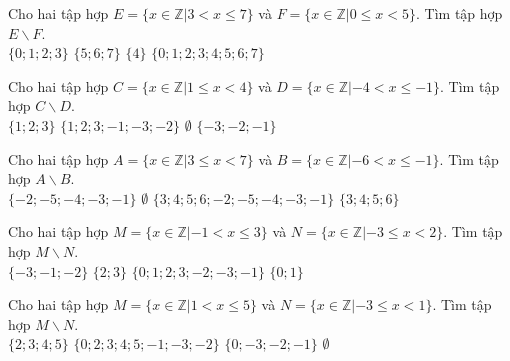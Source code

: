 \begin{ex}
 Cho hai tập hợp $E=\{x\in \mathbb{Z}|3 < x \le 7\}$ và $F=\{x\in \mathbb{Z}|0 \le x < 5\}$. Tìm tập hợp $E \backslash F$.\\ 
\choice
{ $\{{0; 1; 2; 3}\}$ }
   { \True $\{{5; 6; 7}\}$ }
     { $\{{4}\}$ }
    { $\{{0; 1; 2; 3; 4; 5; 6; 7}\}$ }
\end{ex}

\begin{ex}
 Cho hai tập hợp $C=\{x\in \mathbb{Z}|1 \le x < 4\}$ và $D=\{x\in \mathbb{Z}|-4 < x \le -1\}$. Tìm tập hợp $C \backslash D$.\\ 
\choice
{ \True $\{{1; 2; 3}\}$ }
   { $\{{1; 2; 3; -1; -3; -2}\}$ }
     { $\emptyset$ }
    { $\{{-3; -2; -1}\}$ }
\end{ex}

\begin{ex}
 Cho hai tập hợp $A=\{x\in \mathbb{Z}|3 \le x < 7\}$ và $B=\{x\in \mathbb{Z}|-6 < x \le -1\}$. Tìm tập hợp $A \backslash B$.\\ 
\choice
{ $\{{-2; -5; -4; -3; -1}\}$ }
   { $\emptyset$ }
     { $\{{3; 4; 5; 6; -2; -5; -4; -3; -1}\}$ }
    { \True $\{{3; 4; 5; 6}\}$ }
\end{ex}

\begin{ex}
 Cho hai tập hợp $M=\{x\in \mathbb{Z}|-1 < x \le 3\}$ và $N=\{x\in \mathbb{Z}|-3 \le x < 2\}$. Tìm tập hợp $M \backslash N$.\\ 
\choice
{ $\{{-3; -1; -2}\}$ }
   { \True $\{{2; 3}\}$ }
     { $\{{0; 1; 2; 3; -2; -3; -1}\}$ }
    { $\{{0; 1}\}$ }
\end{ex}

\begin{ex}
 Cho hai tập hợp $M=\{x\in \mathbb{Z}|1 < x \le 5\}$ và $N=\{x\in \mathbb{Z}|-3 \le x < 1\}$. Tìm tập hợp $M \backslash N$.\\ 
\choice
{ \True $\{{2; 3; 4; 5}\}$ }
   { $\{{0; 2; 3; 4; 5; -1; -3; -2}\}$ }
     { $\{{0; -3; -2; -1}\}$ }
    { $\emptyset$ }
\end{ex}

